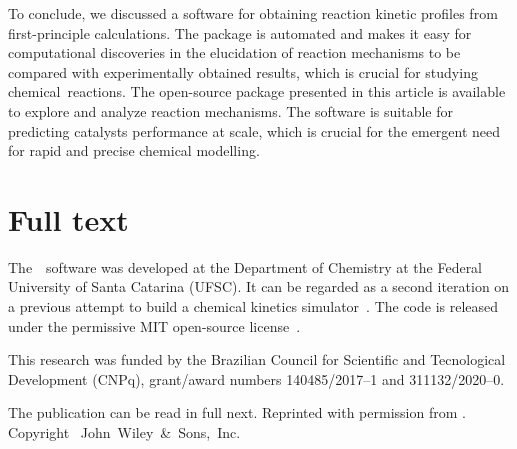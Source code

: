 To conclude,
we discussed a software for obtaining reaction kinetic profiles from first-principle calculations.
The package is automated and makes it easy for computational discoveries in the elucidation of reaction mechanisms
to be compared with experimentally obtained results,
which is crucial for studying chemical~reactions.
The open-source package presented in this article is available to explore and analyze reaction mechanisms.
The software is suitable for predicting catalysts performance at scale,
which is crucial for the emergent need for rapid and precise chemical modelling.

\section{Full text}

The~\overreact{}~software was developed at the Department of Chemistry at the Federal University of Santa Catarina (UFSC).
It can be regarded as a second iteration on a previous attempt to build a chemical kinetics simulator~\cite{pyrrole2019zenodo}.
The code is released under the permissive MIT open-source license~\cite{MITLicense}.

This research was funded by the Brazilian Council for Scientific and Tecnological Development (CNPq),
grant/award numbers 140485/2017--1 and 311132/2020--0.

The publication can be read in full next.
Reprinted with permission from
.
Copyright~\citeyear{Schneider_2022}
John~Wiley~\&~Sons,~Inc.


